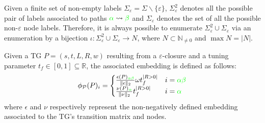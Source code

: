 \begin{definition}[TG Embedding]\label{def:ppne}
Given a finite set of non-empty labels $\Sigma_\varepsilon =\Sigma\backslash\{\varepsilon\}$, $\Sigma_\varepsilon^2$ denotes all the possible pair of labels associated to paths ${\color{green}\alpha}\rightsquigarrow{\color{green}\beta}$ and $\Sigma_\varepsilon$ denotes the set of all the possible non-$\varepsilon$ node labels. Therefore, it is always possible to enumerate $\Sigma_\varepsilon^2\cup\Sigma_\varepsilon$ via an enumeration by a bijection $\iota\colon \Sigma_\varepsilon^2\cup\Sigma_\varepsilon\to  N$, where $N\subset \mathbb{N}_{\neq 0}$ and $\max N=|N|$.
	
Given a TG $P=(s,t,L,R,w)$ resulting from a $\varepsilon$-closure and a tuning parameter $t_f\in[0,1]\subseteq\mathbb{R}$, the associated embedding is defined as follows:
$$\phi_{\mathcal{P}}(P)_i=\begin{cases}
	\frac{\epsilon(P)_{\color{green}\alpha\beta}}{\|\epsilon\|_2}\omega t_f^{|R>0|} & i={\color{green}\alpha\beta}\\
	\frac{\nu(P)_{\color{green}\alpha}}{\|\nu\|_2}t_f^{|R>0|} & i={\color{green}\alpha}\\
\end{cases}$$
where $\epsilon$ and $\nu$ respectively represent the non-negatively defined embedding associated to the TG's transition matrix and nodes. 
\end{definition}

